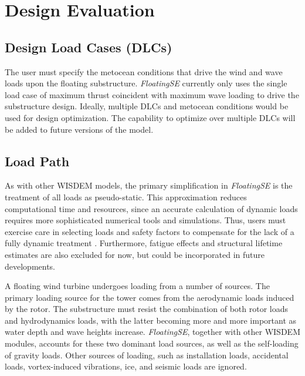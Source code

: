 \section{Design Evaluation}
\label{sec:theory}

\subsection{Design Load Cases (DLCs)}
The user must specify the metocean conditions that drive the wind and
wave loads upon the floating substructure.  \textit{FloatingSE}
currently only uses the single load case of maximum thrust coincident
with maximum wave loading to drive the substructure design. Ideally,
multiple DLCs and metocean conditions would be used for design
optimization.  The capability to optimize over multiple DLCs will be
added to future versions of the model.

\subsection{Load Path}
As with other WISDEM models, the primary simplification in
\textit{FloatingSE} is the treatment of all loads as pseudo-static. This
approximation reduces computational time and resources, since an
accurate calculation of dynamic loads requires more sophisticated
numerical tools and simulations.  Thus, users must exercise care in
selecting loads and safety factors to compensate for the lack of a fully
dynamic treatment \citep{damiani2016}.  Furthermore, fatigue effects and
structural lifetime estimates are also excluded for now, but could be
incorporated in future developments.

A floating wind turbine undergoes loading from a number of sources.  The
primary loading source for the tower comes from the aerodynamic loads
induced by the rotor. The substructure must resist the combination of
both rotor loads and hydrodynamics loads, with the latter becoming more
and more important as water depth and wave heights increase.
\textit{FloatingSE}, together with other WISDEM modules, accounts for
these two dominant load sources, as well as the self-loading of gravity
loads.  Other sources of loading, such as installation loads, accidental
loads, vortex-induced vibrations, ice, and seismic loads are ignored.

